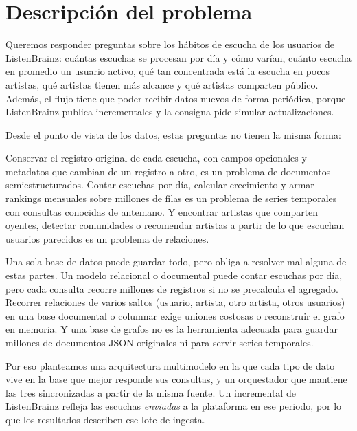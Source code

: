 \section{Descripción del problema}
\label{cap:problema}

Queremos responder preguntas sobre los hábitos de escucha de los usuarios de ListenBrainz: cuántas escuchas se procesan por día y cómo varían, cuánto escucha en promedio un usuario activo, qué tan concentrada está la escucha en pocos artistas, qué artistas tienen más alcance y qué artistas comparten público. Además, el flujo tiene que poder recibir datos nuevos de forma periódica, porque ListenBrainz publica incrementales y la consigna pide simular actualizaciones.

Desde el punto de vista de los datos, estas preguntas no tienen la misma forma:

Conservar el registro original de cada escucha, con campos opcionales y metadatos que cambian de un registro a otro, es un problema de documentos semiestructurados. Contar escuchas por día, calcular crecimiento y armar rankings mensuales sobre millones de filas es un problema de series temporales con consultas conocidas de antemano. Y encontrar artistas que comparten oyentes, detectar comunidades o recomendar artistas a partir de lo que escuchan usuarios parecidos es un problema de relaciones.

Una sola base de datos puede guardar todo, pero obliga a resolver mal alguna de estas partes. Un modelo relacional o documental puede contar escuchas por día, pero cada consulta recorre millones de registros si no se precalcula el agregado. Recorrer relaciones de varios saltos (usuario, artista, otro artista, otros usuarios) en una base documental o columnar exige uniones costosas o reconstruir el grafo en memoria. Y una base de grafos no es la herramienta adecuada para guardar millones de documentos JSON originales ni para servir series temporales.

Por eso planteamos una arquitectura multimodelo en la que cada tipo de dato vive en la base que mejor responde sus consultas, y un orquestador que mantiene las tres sincronizadas a partir de la misma fuente. Un incremental de ListenBrainz refleja las escuchas \emph{enviadas} a la plataforma en ese periodo, por lo que los resultados describen ese lote de ingesta.
